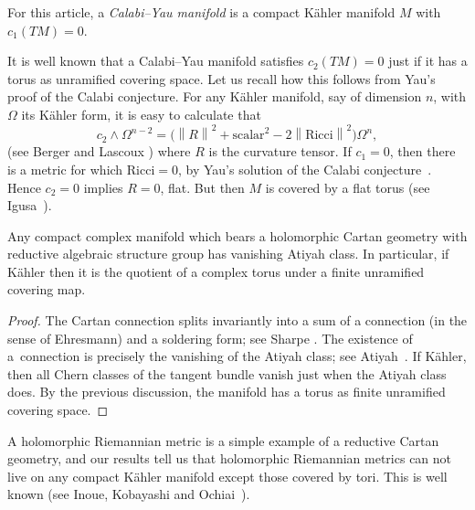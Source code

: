 \documentclass[pdftex]{sigma}
\begin{document}
\begin{definition} For this article, a \emph{Calabi--Yau manifold}
is a compact K{\"a}hler manifold $M$ with $c_1(TM)=0$.
\end{definition}

It is well known that a Calabi--Yau manifold satisf\/ies $c_2(TM)=0$ just
if it has a torus as unramif\/ied covering space.
Let us recall how this follows from Yau's proof of the Calabi conjecture.
For any K{\"a}hler manifold, say of dimension $n$,
with $\Omega$ its K{\"a}hler form, it is easy to calculate that
\[
c_2 \wedge \Omega^{n-2} = \big(\left\|R\right\|^2 + \text{scalar}^2
- 2 \left\|\text{Ricci}\right\|^2 \big) \Omega^n,
\]
(see Berger and Lascoux \cite{Lascoux/Berger:1970})
where $R$ is the curvature tensor. If $c_1=0$, then
there is a metric for which $\text{Ricci}=0$, by
Yau's solution of the Calabi conjecture~\cite{Yau:1977}.
Hence $c_2=0$ implies $R=0$, f\/lat. But then
$M$ is covered by a f\/lat
torus (see Igusa~\cite{Igusa:1954}).


\begin{lemma}
Any compact complex manifold which bears a holomorphic
Cartan geometry with reductive algebraic structure
group has vanishing Atiyah class.
In particular, if K{\"a}hler then
it is the quotient of a complex torus
under a finite unramified covering map.
\end{lemma}
\begin{proof}
The Cartan connection splits invariantly into a sum
of a connection (in the sense of Ehresmann) and
a soldering form; see Sharpe \cite[Lemma~2.1, p.~362]{Sharpe:1997}.
The existence of a~connection is precisely the
vanishing of the Atiyah class; see Atiyah~\cite{Atiyah:1957}.
If K{\"a}hler, then all Chern classes of the
tangent bundle vanish just when the Atiyah class
does. By the previous discussion, the manifold has a torus as f\/inite unramif\/ied
covering space.
\end{proof}

\begin{example}
A holomorphic Riemannian metric is a simple
example of a reductive Cartan geometry,
and our results tell us that holomorphic
Riemannian metrics can not live on any
compact K{\"a}hler manifold except those
covered by tori. This is well known (see
Inoue, Kobayashi and Ochiai~\cite{Inoue/Kobayashi/Ochiai:1980}).
\end{example}
\end{document}
